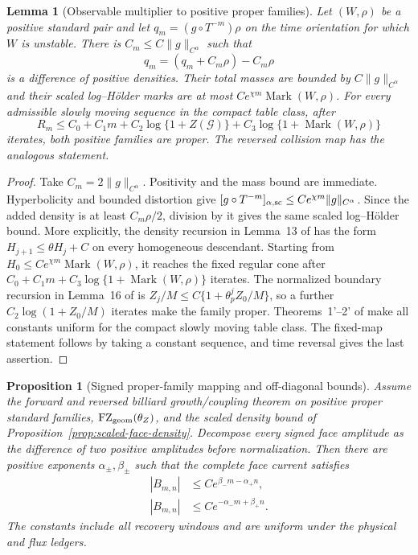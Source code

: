 \documentclass[11pt]{article}
\newtheorem{proposition}[theorem]{Proposition}
\newtheorem{lemma}[theorem]{Lemma}
\begin{document}
\begin{lemma}[Observable multiplier to positive proper families]
\label{lem:signed-observable-multiplier}
Let $(W,\rho)$ be a positive standard pair and let
$q_m=(g\circ T^{-m})\rho$ on the time orientation for which $W$ is unstable.
There is $C_m\le C\|g\|_{C^\alpha}$ such that
\[
 q_m=(q_m+C_m\rho)-C_m\rho
\]
is a difference of positive densities.  Their total masses are bounded by
$C\|g\|_{C^\alpha}$ and their scaled log--H\"older marks are at most
$Ce^{\chi m}\operatorname{Mark}(W,\rho)$.  For every admissible slowly
moving sequence in the compact table class, after
\begin{equation}
\label{eq:multiplier-recovery-time}
 R_m\le C_0+C_1m
       +C_2\log\{1+Z(\mathcal G)\}
       +C_3\log\{1+\operatorname{Mark}(W,\rho)\}
\end{equation}
iterates, both positive families are proper.  The reversed collision map has
the analogous statement.
\end{lemma}

\begin{proof}
Take $C_m=2\|g\|_{C^\alpha}$.  Positivity and the mass bound are immediate.
Hyperbolicity and bounded distortion give
$[g\circ T^{-m}]_{\alpha,\rm sc}\le Ce^{\chi m}\|g\|_{C^\alpha}$.
Since the added density is at least $C_m\rho/2$, division by it gives the same
scaled log--H\"older bound.  More explicitly, the density recursion in
Lemma~13 of \cite{SYZ} has the form
$H_{j+1}\le\theta H_j+C$ on every homogeneous descendant.  Starting from
$H_0\le Ce^{\chi m}\operatorname{Mark}(W,\rho)$, it reaches the fixed regular
cone after
$C_0+C_1m+C_3\log\{1+\operatorname{Mark}(W,\rho)\}$ iterates.  The normalized boundary recursion in
Lemma~16 of \cite{SYZ} is
$Z_j/M\le C\{1+\theta_p^j Z_0/M\}$, so a further
$C_2\log(1+Z_0/M)$ iterates make the family proper.  Theorems~1'--2' of
\cite{SYZ} make all constants uniform for the compact slowly moving table
class.  The fixed-map statement follows by taking a constant sequence, and
time reversal gives the last assertion.
\end{proof}

\begin{proposition}[Signed proper-family mapping and off-diagonal bounds]
\label{prop:signed-off-diagonal-mapping}
Assume the forward and reversed billiard growth/coupling theorem on positive
proper standard families, $\mathrm{FZ}_{\rm geom}(\theta_Z)$, and the scaled density
bound of Proposition~\ref{prop:scaled-face-density}.  Decompose every signed
face amplitude as the difference of two positive amplitudes before
normalization.  Then there are positive exponents
$\alpha_\pm,\beta_\pm$ such that the complete face current satisfies
\begin{align}
 |B_{m,n}|&\le Ce^{\beta_-m-\alpha_+n},
 \label{eq:verified-forward-cone}\\
 |B_{m,n}|&\le Ce^{-\alpha_-m+\beta_+n}.
 \label{eq:verified-backward-cone}
\end{align}
The constants include all recovery windows and are uniform under the
physical and flux ledgers.
\end{proposition}
\end{document}
